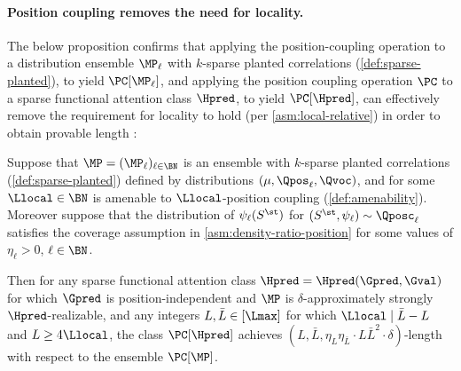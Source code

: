 \documentclass{article}
\begin{document}
\paragraph{Position coupling removes the need for locality.} The below proposition confirms that applying the position-coupling operation to a distribution ensemble $\MP_\ell$ with $k$-sparse planted correlations (\cref{def:sparse-planted}), to yield $\PC[\MP_\ell]$, and applying the position coupling operation $\PC$ to a sparse functional attention class $\Hpred$, to yield $\PC[\Hpred]$, 
can effectively remove the requirement for locality to hold (per \cref{asm:local-relative}) in order to obtain provable length \generalization:
\begin{proposition}
  \label{prop:pc-length-extrap}
  Suppose that $\MP = (\MP_\ell)_{\ell \in \BN}$ is an ensemble with $k$-sparse planted correlations (\cref{def:sparse-planted}) defined by distributions $(\mu, \Qpos_\ell, \Qvoc)$, and for some $\Llocal \in \BN$ is amenable to $\Llocal$-position coupling (\cref{def:amenability}). Moreover suppose that the distribution of $\psi_\ell(S^\st)$ for $ (S^\st, \psi_\ell) \sim \Qposc_\ell$ satisfies the coverage assumption in \cref{asm:density-ratio-position} for some values of $\eta_\ell > 0$, $\ell \in \BN$. 

  Then for any sparse functional attention class $\Hpred = \Hpred(\Gpred, \Gval)$ for which $\Gpred$ is position-independent and $\MP$ is $\delta$-approximately strongly $\Hpred$-realizable, and any integers $L, \bar L \in [\Lmax]$ for which $\Llocal \mid \bar L - L$ and $L \geq 4\Llocal$, %
  the class $\PC[\Hpred]$ achieves $(L, \bar L, \eta_L \eta_{\bar L} \cdot L\bar L^2 \cdot \delta)$-length \generalization with respect to the ensemble $\PC[\MP]$. 
\end{proposition}
\end{document}
